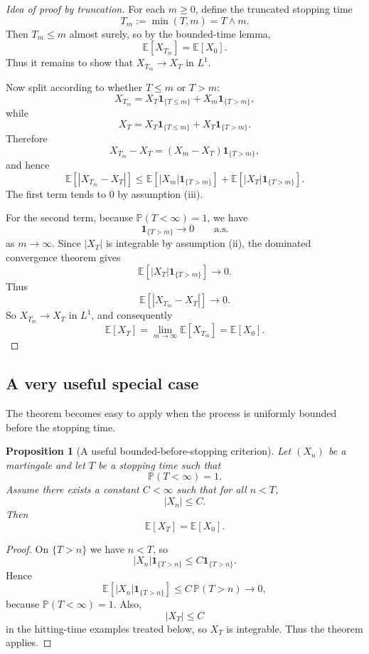 \documentclass[11pt]{article}
\newtheorem{proposition}[theorem]{Proposition}
\theoremstyle{definition}
\begin{document}
\begin{proof}[Idea of proof by truncation]
For each \(m\ge 0\), define the truncated stopping time
\[
T_m:=\min(T,m)=T\wedge m.
\]
Then \(T_m\le m\) almost surely, so by the bounded-time lemma,
\[
\mathbb E[X_{T_m}]=\mathbb E[X_0].
\]
Thus it remains to show that \(X_{T_m}\to X_T\) in \(L^1\).

Now split according to whether \(T\le m\) or \(T>m\):
\[
X_{T_m}=X_T\mathbf 1_{\{T\le m\}}+X_m\mathbf 1_{\{T>m\}},
\]
while
\[
X_T=X_T\mathbf 1_{\{T\le m\}}+X_T\mathbf 1_{\{T>m\}}.
\]
Therefore
\[
X_{T_m}-X_T=(X_m-X_T)\mathbf 1_{\{T>m\}},
\]
and hence
\[
\mathbb E[|X_{T_m}-X_T|]
\le
\mathbb E[|X_m|\mathbf 1_{\{T>m\}}]
+
\mathbb E[|X_T|\mathbf 1_{\{T>m\}}].
\]
The first term tends to \(0\) by assumption (iii).

For the second term, because \(\mathbb P(T<\infty)=1\), we have
\[
\mathbf 1_{\{T>m\}}\to 0
\qquad \text{a.s.}
\]
as \(m\to\infty\). Since \(|X_T|\) is integrable by assumption (ii), the dominated convergence theorem gives
\[
\mathbb E[|X_T|\mathbf 1_{\{T>m\}}]\to 0.
\]
Thus
\[
\mathbb E[|X_{T_m}-X_T|]\to 0.
\]
So \(X_{T_m}\to X_T\) in \(L^1\), and consequently
\[
\mathbb E[X_T]=\lim_{m\to\infty}\mathbb E[X_{T_m}]=\mathbb E[X_0].
\]
\end{proof}

\subsection{A very useful special case}

The theorem becomes easy to apply when the process is uniformly bounded before the stopping time.

\begin{proposition}[A useful bounded-before-stopping criterion]
Let \((X_n)\) be a martingale and let \(T\) be a stopping time such that
\[
\mathbb P(T<\infty)=1.
\]
Assume there exists a constant \(C<\infty\) such that for all \(n<T\),
\[
|X_n|\le C.
\]
Then
\[
\mathbb E[X_T]=\mathbb E[X_0].
\]
\end{proposition}

\begin{proof}
On \(\{T>n\}\) we have \(n<T\), so
\[
|X_n|\mathbf 1_{\{T>n\}}\le C\mathbf 1_{\{T>n\}}.
\]
Hence
\[
\mathbb E[|X_n|\mathbf 1_{\{T>n\}}]
\le
C\,\mathbb P(T>n)\to 0,
\]
because \(\mathbb P(T<\infty)=1\).
Also,
\[
|X_T|\le C
\]
in the hitting-time examples treated below, so \(X_T\) is integrable. Thus the theorem applies.
\end{proof}
\end{document}
